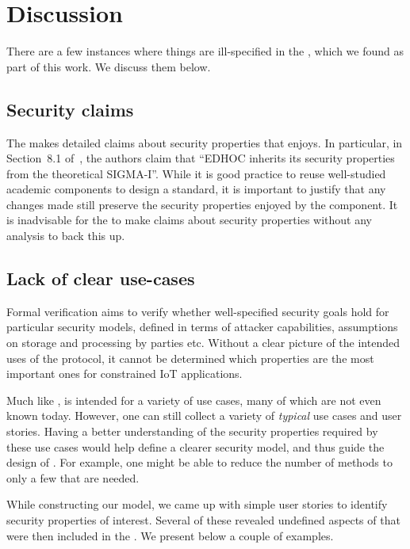\documentclass[runningheads,draft,x11names]{llncs}
\begin{document}
\section{Discussion}
\label{sec:discussion}
There are a few instances where things are ill-specified in the \mSpec{}, which we found as part of this work. We discuss them below. 

\subsection{Security claims}
\label{sec:securityClaims}
The \mSpec{} makes detailed claims about security properties that \mEdhoc{} enjoys. In particular, in Section~8.1 of~\cite{selander-lake-edhoc-01}, the authors claim that ``EDHOC inherits its security properties from the theoretical SIGMA-I''. While it is good practice to reuse well-studied academic components to design a standard, it is important to justify that any changes made still preserve the security properties enjoyed by the component. It is inadvisable for the \mSpec{} to make claims about security properties without any analysis to back this up.   

\subsection{Lack of clear use-cases}
\label{sec:unclearProtocolUse}
Formal verification aims to verify whether well-specified security goals hold for particular security models, defined in terms of attacker capabilities, assumptions on storage and processing by parties etc. Without a clear picture of the intended uses of the protocol, it cannot be determined which properties are the most important ones for constrained IoT applications.

Much like \mDandTls{}, \mEdhoc{} is intended for a variety of use cases,
many of which are not even known today. However, one can still collect a variety of \emph{typical} use cases and user stories. Having a better understanding of the security properties required by these use cases would help define a clearer security model, and thus guide the design of \mEdhoc{}. For example, one might be able to reduce the number of methods to only a few that are needed.

While constructing our model, we came up with simple user stories to identify security properties of interest. Several of these revealed undefined aspects of \mEdhoc{} that were then included in the \mSpec. We present below a couple of examples.
\end{document}
